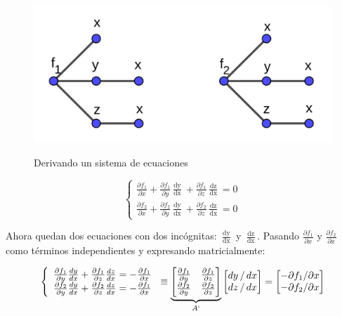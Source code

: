 \documentclass{article}
\begin{document}
\begin{figure}[ht]
\caption{Derivando un sistema de ecuaciones}
\includegraphics[scale=1]{img/teo_fig014_tcd.png} 
\centering
\label{fig:tcd}
\end{figure}

\begin{equation}
\left\{
\begin{array}{ll}
\frac{\partial f_1}{\partial x} + \frac{\partial f_1}{\partial y} \frac{\mathop{dy}}{\mathop{dx}} + \frac{\partial f_1}{\partial z} \frac{\mathop{dz}}{\mathop{dx}} = 0 \\
\frac{\partial f_2}{\partial x} + \frac{\partial f_2}{\partial y} \frac{\mathop{dy}}{\mathop{dx}} + \frac{\partial f_2}{\partial z} \frac{\mathop{dz}}{\mathop{dx}} = 0
\end{array}
\right.
\end{equation}

Ahora quedan dos ecuaciones con dos incógnitas: $\frac{\mathop{dy}}{\mathop{dx}}$ y $\frac{\mathop{dz}}{\mathop{dx}}$. Pasando $\frac{\partial f_1}{\partial x}$ y $\frac{\partial f_2}{\partial x}$ como términos independientes y expresando matricialmente:

\begin{equation}
\left\{
\begin{array}{ll}
\frac{\partial f_1}{\partial y} \frac{\mathop{dy}}{\mathop{dx}} + \frac{\partial f_1}{\partial z} \frac{\mathop{dz}}{\mathop{dx}} = -\frac{\partial f_1}{\partial x} \\
\frac{\partial f_2}{\partial y} \frac{\mathop{dy}}{\mathop{dx}} + \frac{\partial f_2}{\partial z} \frac{\mathop{dz}}{\mathop{dx}} = -\frac{\partial f_1}{\partial x}
\end{array}
\right. \equiv 
\underbrace{
\begin{bmatrix}
\frac{\partial f_1}{\partial y} & \frac{\partial f_1}{\partial z} \\
\frac{\partial f_2}{\partial y} & \frac{\partial f_2}{\partial z}
\end{bmatrix}
}_{A`}
\begin{bmatrix}
\mathop{dy}/\mathop{dx} \\
\mathop{dz}/\mathop{dx}
\end{bmatrix} = 
\begin{bmatrix}
-\partial f_1/ \partial x \\
-\partial f_2/ \partial x
\end{bmatrix}
\end{equation}
\end{document}
